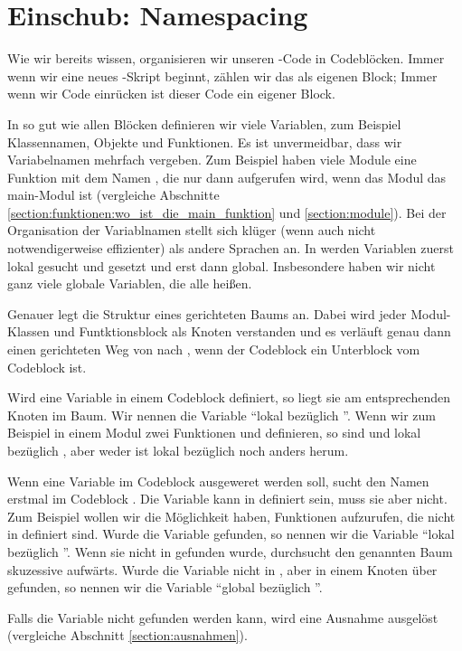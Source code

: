 \section{Einschub: Namespacing}
\label{section:namespacing}
Wie wir bereits wissen, organisieren wir unseren \Python-Code in Codeblöcken.
Immer wenn wir eine neues \Python-Skript beginnt, zählen wir das als eigenen Block;
Immer wenn wir Code einrücken ist dieser Code ein eigener Block.

In so gut wie allen Blöcken definieren wir viele Variablen, zum Beispiel Klassennamen, Objekte und Funktionen.
Es ist unvermeidbar, dass wir Variabelnamen mehrfach vergeben.
Zum Beispiel haben viele Module eine Funktion mit dem Namen , die nur dann aufgerufen wird,
wenn das Modul das main-Modul ist (vergleiche Abschnitte \ref{section:funktionen:wo_ist_die_main_funktion} und \ref{section:module}).
Bei der Organisation der Variablnamen stellt sich \Python klüger (wenn auch nicht notwendigerweise effizienter) als andere Sprachen an.
In \Python werden Variablen zuerst lokal gesucht und gesetzt und erst dann global.
Insbesondere haben wir nicht ganz viele globale Variablen, die alle  heißen.

Genauer legt \Python die Struktur eines gerichteten Baums an.
Dabei wird jeder Modul- Klassen und Funtktionsblock als Knoten verstanden und es verläuft genau dann einen gerichteten Weg von  nach ,
wenn der Codeblock  ein Unterblock vom Codeblock  ist.

Wird eine Variable in einem Codeblock  definiert, so liegt sie am entsprechenden Knoten im Baum.
Wir nennen die Variable ``lokal bezüglich ''.
Wenn wir zum Beispiel in einem Modul  zwei Funktionen  und  definieren,
so sind  und  lokal bezüglich , aber weder  ist lokal bezüglich  noch anders herum.

Wenn eine Variable  im Codeblock  ausgeweret werden soll, sucht \Python den Namen  erstmal im Codeblock .
Die Variable  kann in  definiert sein, muss sie aber nicht.
Zum Beispiel wollen wir die Möglichkeit haben, Funktionen aufzurufen, die nicht in  definiert sind.
Wurde die Variable gefunden, so nennen wir die Variable ``lokal bezüglich ''.
Wenn sie nicht in  gefunden wurde, durchsucht \Python den genannten Baum skuzessive aufwärts.
Wurde die Variable nicht in , aber in einem Knoten über  gefunden, so nennen wir die Variable ``global bezüglich ''.

Falls die Variable nicht gefunden werden kann, wird eine Ausnahme ausgelöst (vergleiche Abschnitt \ref{section:ausnahmen}).
